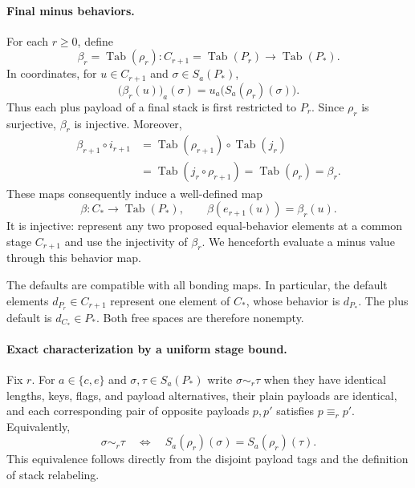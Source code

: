 \paragraph{Final minus behaviors.}
For each $r\geq0$, define
\begin{equation}
  \beta_r=\operatorname{Tab}(\rho_r):
        C_{r+1}=\operatorname{Tab}(P_r)
            \longrightarrow\operatorname{Tab}(P_*).
  \label{obs:free-behavior-stage}
\end{equation}
In coordinates, for $u\in C_{r+1}$ and $\sigma\in S_a(P_*)$,
\[
  \bigl(\beta_r(u)\bigr)_a(\sigma)
       =u_a\bigl(S_a(\rho_r)(\sigma)\bigr).
\]
Thus each plus payload of a final stack is first restricted to
$P_r$.  Since $\rho_r$ is surjective, $\beta_r$ is injective.
Moreover,
\begin{align*}
  \beta_{r+1}\circ i_{r+1}
    &=\operatorname{Tab}(\rho_{r+1})
                          \circ\operatorname{Tab}(j_r)\\
    &=\operatorname{Tab}(j_r\circ\rho_{r+1})
      =\operatorname{Tab}(\rho_r)=\beta_r.
\end{align*}
These maps consequently induce a well-defined map
\begin{equation}
  \beta:C_*\longrightarrow\operatorname{Tab}(P_*),
  \qquad
  \beta(e_{r+1}(u))=\beta_r(u).
  \label{obs:free-behavior}
\end{equation}
It is injective: represent any two proposed equal-behavior elements
at a common stage $C_{r+1}$ and use the injectivity of $\beta_r$.
We henceforth evaluate a minus value through this behavior map.

The defaults are compatible with all bonding maps.  In particular,
the default elements $d_{P_r}\in C_{r+1}$ represent one element of
$C_*$, whose behavior is $d_{P_*}$.  The plus default is
$d_{C_*}\in P_*$.  Both free spaces are therefore nonempty.

\paragraph{Exact characterization by a uniform stage bound.}
Fix $r$.  For $a\in\{c,e\}$ and $\sigma,\tau\in S_a(P_*)$ write
$\sigma\sim_r\tau$ when they have identical lengths, keys, flags,
and payload alternatives, their plain payloads are identical, and
each corresponding pair of opposite payloads $p,p'$ satisfies
$p\equiv_r p'$.  Equivalently,
\begin{equation}
  \sigma\sim_r\tau
    \quad\Longleftrightarrow\quad
  S_a(\rho_r)(\sigma)=S_a(\rho_r)(\tau).
  \label{obs:free-stack-equivalence}
\end{equation}
This equivalence follows directly from the disjoint payload tags
and the definition of stack relabeling.

